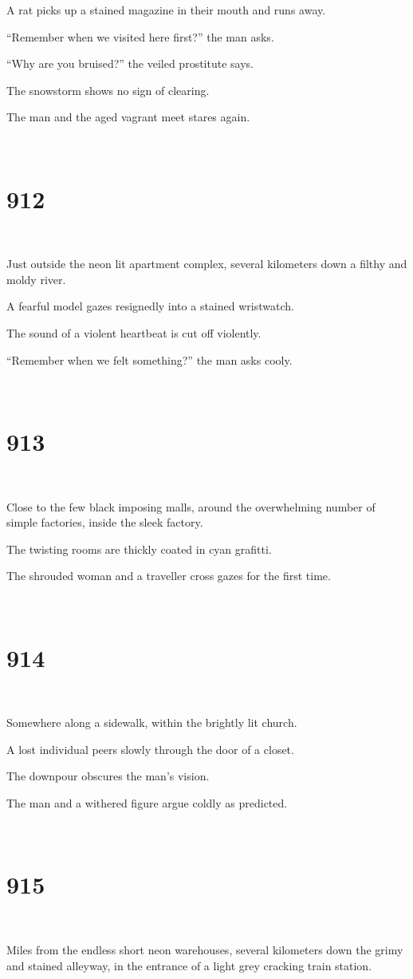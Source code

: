 \documentclass{report}
\begin{document}
A rat picks up a stained magazine in their mouth and runs away.

``Remember when we visited here first?'' the man asks.

``Why are you bruised?'' the veiled prostitute says.

The snowstorm shows no sign of clearing.

The man and the aged vagrant meet stares again.

~
\chapter*{912}
~

Just outside the neon lit apartment complex, several kilometers down a filthy and moldy river.

A fearful model gazes resignedly into a stained wristwatch.

The sound of a violent heartbeat is cut off violently.

``Remember when we felt something?'' the man asks cooly.

~
\chapter*{913}
~

Close to the few black imposing malls, around the overwhelming number of simple factories, inside the sleek factory.

The twisting rooms are thickly coated in cyan grafitti.

The shrouded woman and a traveller cross gazes for the first time.

~
\chapter*{914}
~

Somewhere along a sidewalk, within the brightly lit church.

A lost individual peers slowly through the door of a closet.

The downpour obscures the man's vision.

The man and a withered figure argue coldly as predicted.

~
\chapter*{915}
~

Miles from the endless short neon warehouses, several kilometers down the grimy and stained alleyway, in the entrance of a light grey cracking train station.
\end{document}

